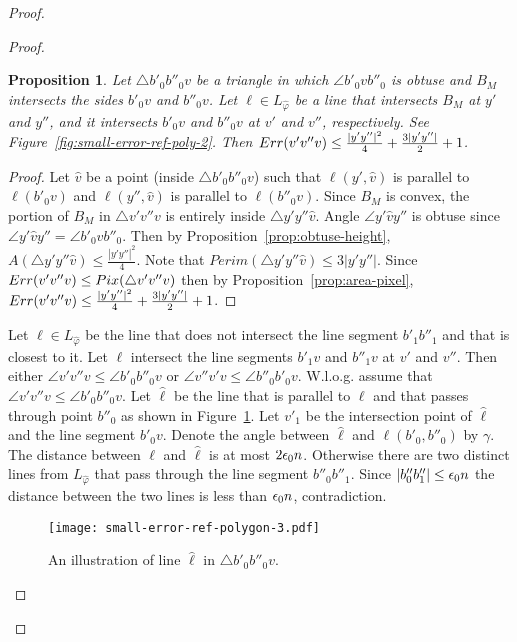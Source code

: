 \documentclass[11pt,english]{article}
\newtheorem{proposition}[theorem]{Proposition}
\numberwithin{figure}{section}
\begin{document}
\begin{proof}
{\begin{proof}
\begin{proposition}
\label{prop:small-error-above}
Let $\bigtriangleup b'_0b''_0v$ be a triangle in which $\angle b'_0vb''_0$ is obtuse and $B_M$ intersects the sides $b'_0v$ and $b''_0v$. Let $\ell\in L_{\hat\varphi}$ be a line that intersects $B_M$ at $y'$ and $y''$, and it intersects $b'_0v$ and $b''_0v$ at $v'$ and $v''$, respectively. See Figure~\ref{fig:small-error-ref-poly-2}. Then $Err(v'v''v)\leq\frac{|y'y''|^2}{4}+\frac{3|y'y''|}2+1$.
\end{proposition}
\begin{proof}
Let $\hat{v}$ be a point (inside $\bigtriangleup b'_0b''_0v$) such that $\ell(y',\hat{v})$ is parallel to $\ell(b'_0v)$ and $\ell(y'',\hat{v})$ is parallel to $\ell(b''_0v)$. Since $B_M$ is convex, the portion of $B_M$ in $\bigtriangleup v'v''v$ is entirely inside $\bigtriangleup y'y''\hat{v}$. Angle $\angle y'\hat{v}y''$ is obtuse since $\angle y'\hat{v}y''=\angle b'_0vb''_0$. Then by Proposition~\ref{prop:obtuse-height}, $A(\bigtriangleup y'y''\hat{v})\leq\frac{|y'y''|^2}{4}$. Note that $Perim(\bigtriangleup y'y''\hat{v})\leq 3|y'y''|$. Since $Err(v'v''v)\leq Pix(\bigtriangleup v'v''v)$ then by Proposition~\ref{prop:area-pixel}, $Err(v'v''v)\leq\frac{|y'y''|^2}{4}+\frac{3|y'y''|}2+1$.
\end{proof}

Let $\ell\in L_{\hat\varphi}$ be the line that does not intersect the line segment $b'_1b''_1$ and that is closest to it. Let $\ell$ intersect the line segments $b'_1v$ and $b''_1v$ at $v'$ and $v''$. Then either $\angle v'v''v\leq \angle b'_0b''_0v$ or $\angle v''v'v\leq \angle b''_0b'_0v$. W.l.o.g. assume that $\angle v'v''v\leq \angle b'_0b''_0v$.
Let $\hat{\ell}$ be the line that is parallel to $\ell$ and that passes through point $b''_0$ as shown in Figure~\ref{fig:small-error-ref-poly-3}. Let $v'_1$ be the intersection point of $\hat{\ell}$ and the line segment $b'_0v$. Denote the angle between $\hat{\ell}$ and $\ell(b'_0,b''_0)$ by $\gamma$. The distance between $\ell$ and $\hat{\ell}$ is at  most $2{\epsilon_0} n$. Otherwise there are two distinct lines from $L_{\hat\varphi}$ that pass through the line segment $b''_0b''_1$. Since $|b''_0b''_1|\leq {\epsilon_0} n$ the distance between the two lines is less than ${\epsilon_0} n$, contradiction.

\begin{figure}
\centering
\texttt{[image: small-error-ref-polygon-3.pdf]}
\caption{ An illustration of line $\hat{\ell}$ in $\bigtriangleup b'_0b''_0v$.}
\label{fig:small-error-ref-poly-3}
\end{figure}


\end{proof}}
\end{proof}
\end{document}
